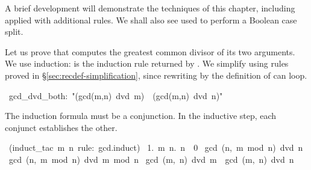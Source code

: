 %
A brief development will demonstrate the techniques of this chapter,
including  applied with additional rules.  We shall also see
 used to perform a Boolean case split.

Let us prove that  computes the greatest common
divisor of its two arguments.  
%
We use induction:  is the
induction rule returned by .  We simplify using
rules proved in {\S}\ref{sec:recdef-simplification}, since rewriting by the
definition of  can loop.
\begin{isabelle}
\ gcd_dvd_both:\ "(gcd(m,n)\ dvd\ m)\ \isasymand\ (gcd(m,n)\ dvd\
n)"
\end{isabelle}
The induction formula must be a conjunction.  In the
inductive step, each conjunct establishes the other. 
\begin{isabelle}
\ (induct_tac\ m\ n\ rule:\ gcd.induct)\isanewline
\ 1.\ \isasymAnd m\ n.\ n\ \isasymnoteq \ 0\ \isasymlongrightarrow \isanewline
\isaindent{\ 1.\ \isasymAnd m\ n.\ }gcd\ (n,\ m\ mod\ n)\ dvd\ n\ \isasymand
\ gcd\ (n,\ m\ mod\ n)\ dvd\ m\ mod\ n\isanewline
{}\isasymLongrightarrow\ gcd\ (m,\ n)\
dvd\ m\ \isasymand \ gcd\ (m,\ n)\ dvd\ n%
\end{isabelle}

